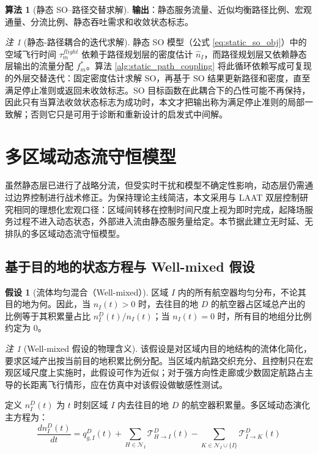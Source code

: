 \documentclass[a4paper,12pt]{article}
\theoremstyle{plain}
\theoremstyle{definition}
\newtheorem{assumption}[theorem]{假设}
\newtheorem{algorithm}[theorem]{算法}
\theoremstyle{remark}
\newtheorem{remark}[theorem]{注}
\begin{document}
\begin{algorithm}[静态 SO--路径交替求解]
\textbf{输出}：静态服务流量、近似均衡路径比例、宏观通量、分流比例、静态吞吐需求和收敛状态标志。
\end{algorithm}

\begin{remark}[静态-路径耦合的迭代求解]\label{rem:static_path_coupling}
静态 SO 模型（公式 \ref{eq:static_so_obj}）中的空域飞行时间 $\tau_m^{flight}$ 依赖于路径规划层的密度估计 $\hat{n}_I$，而路径规划层又依赖静态层输出的流量分配 $f_m^*$。算法 \ref{alg:static_path_coupling} 将此循环依赖写成可复现的外层交替迭代：固定密度估计求解 SO，再基于 SO 结果更新路径和密度，直至满足停止准则或返回未收敛标志。SO 目标函数在此耦合下的凸性可能不再保持，因此只有当算法收敛状态标志为成功时，本文才把输出称为满足停止准则的局部一致解；否则它只是可用于诊断和重新设计的启发式中间解。
\end{remark}

\section{多区域动态流守恒模型}

虽然静态层已进行了战略分流，但受实时干扰和模型不确定性影响，动态层仍需通过边界控制进行战术修正。为保持理论主线简洁，本文采用与 LAAT 双层控制研究相同的理想化宏观口径：区域间转移在控制时间尺度上视为即时完成，起降场服务过程不进入动态状态，外部进入流由静态服务量给定。本节据此建立无时延、无排队的多区域动态流守恒模型。

\subsection{基于目的地的状态方程与 Well-mixed 假设}

\begin{assumption}[流体均匀混合（Well-mixed）]\label{asm:well_mixed}
区域 $I$ 内的所有航空器均匀分布，不论其目的地为何。因此，当 $n_I(t)>0$ 时，去往目的地 $D$ 的航空器占区域总产出的比例等于其积累量占比 $n_I^D(t)/n_I(t)$；当 $n_I(t)=0$ 时，所有目的地组分比例约定为 $0$。
\end{assumption}

\begin{remark}[Well-mixed 假设的物理含义]
该假设是对区域内目的地结构的流体化简化，要求区域产出按当前目的地积累比例分配。当区域内航路交织充分、且控制只在宏观区域尺度上实施时，此假设可作为近似；对于强方向性走廊或少数固定航路占主导的长距离飞行情形，应在仿真中对该假设做敏感性测试。
\end{remark}

定义 $n_I^D(t)$ 为 $t$ 时刻区域 $I$ 内去往目的地 $D$ 的航空器积累量。多区域动态演化主方程为：
\begin{equation} \label{eq:dynamic_master}
    \frac{d n_I^D(t)}{dt} = q_{g, I}^D(t) + \sum_{H \in \mathcal{N}_I} \mathcal{T}_{H \to I}^D(t) - \sum_{K \in \mathcal{N}_I \cup \{I\}} \mathcal{T}_{I \to K}^D(t)
\end{equation}
\end{document}
